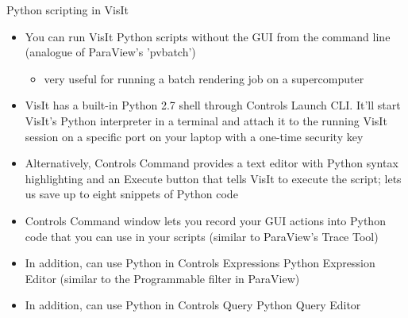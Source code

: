 \begin{comment}
http://www.visitusers.org/index.php?title=VisIt-tutorial-Python-scripting
http://www.visitusers.org/index.php?title=VisIt-tutorial-Advanced-scripting
http://www.visitusers.org/index.php?title=Exporting_databases
Tips for searching for help
http://www.visitusers.org/index.php?title=VisIt-tutorial-Python-scripting#Learning_the_CLI
\end{comment}


\begin{frame}{Python scripting in VisIt}{}
  \footnotesize{
    \begin{itemize}\setlength{\itemsep}{1mm}
    \item[\ding{80}] You can run VisIt Python scripts without the GUI from the command line (analogue of
      ParaView's 'pvbatch')\guiless\vspace{-3mm}
      \begin{itemize}\setlength{\itemsep}{0mm}
      \item very useful for running a batch rendering job on a supercomputer
      \end{itemize}
    \item[\ding{80}] VisIt has a built-in Python 2.7 shell through Controls \ra Launch CLI. It'll start
      VisIt's Python interpreter in a terminal and attach it to the running VisIt session on a specific
      port on your laptop with a one-time security key
    \item[\ding{80}] Alternatively, Controls \ra Command provides a text editor with Python syntax
      highlighting and an Execute button that tells VisIt to execute the script; lets us save up to eight
      snippets of Python code
    \item {\color{red}Controls \ra Command window lets you record your GUI actions into Python code that
      you can use in your scripts (similar to ParaView's Trace Tool)}
    \item {\color{blue}In addition, can use Python in Controls \ra Expressions \ra Python Expression
      Editor (similar to the Programmable filter in ParaView)}
    \item {\color{blue}In addition, can use Python in Controls \ra Query \ra Python Query Editor}
    \end{itemize}}
\end{frame}

